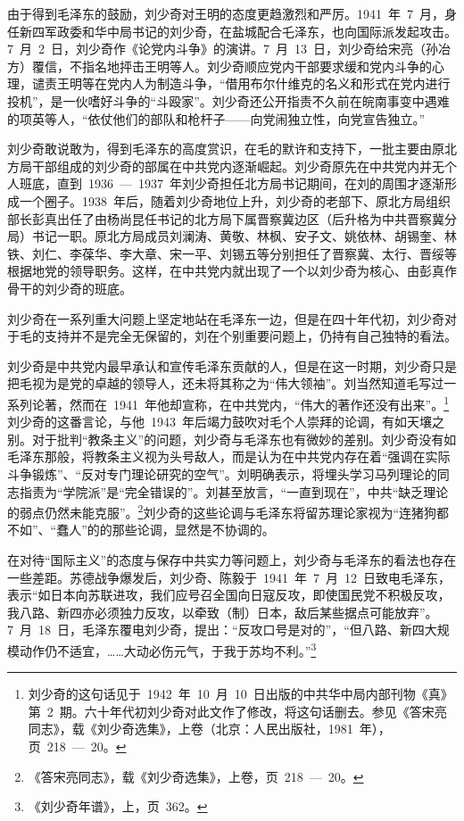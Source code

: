 由于得到毛泽东的鼓励，刘少奇对王明的态度更趋激烈和严厉。1941~年~7~月，身任新四军政委和华中局书记的刘少奇，在盐城配合乇泽东，也向国际派发起攻击。7~月~2~日，刘少奇作《论党内斗争》的演讲。7~月~13~日，刘少奇给宋亮（孙冶方）覆信，不指名地抨击王明等人。刘少奇顺应党内干部要求缓和党内斗争的心理，谴责王明等在党内人为制造斗争，“借用布尔什维克的名义和形式在党内进行投机”，是一伙嗜好斗争的“斗殴家”。刘少奇还公开指责不久前在皖南事变中遇难的项英等人，“依仗他们的部队和枪杆子——向党闹独立性，向党宣告独立。”

刘少奇敢说敢为，得到毛泽东的高度赏识，在毛的默许和支持下，一批主要由原北方局干部组成的刘少奇的部属在中共党内逐渐崛起。刘少奇原先在中共党内并无个人班底，直到~1936~—~1937~年刘少奇担任北方局书记期间，在刘的周围才逐渐形成一个圈子。1938~年后，随着刘少奇地位上升，刘少奇的老部下、原北方局组织部长彭真出任了由杨尚昆任书记的北方局下属晋察冀边区（后升格为中共晋察冀分局）书记一职。原北方局成员刘澜涛、黄敬、林枫、安子文、姚依林、胡锡奎、林铁、刘仁、李葆华、李大章、宋一平、刘锡五等分别担任了晋察冀、太行、晋绥等根据地党的领导职务。这样，在中共党内就出现了一个以刘少奇为核心、由彭真作骨干的刘少奇的班底。

刘少奇在一系列重大问题上坚定地站在毛泽东一边，但是在四十年代初，刘少奇对于毛的支持并不是完全无保留的，刘在个别重要问题上，仍持有自己独特的看法。

刘少奇是中共党内最早承认和宣传毛泽东贡献的人，但是在这一时期，刘少奇只是把毛视为是党的卓越的领导人，还未将其称之为“伟大领袖”。刘当然知道毛写过一系列论著，然而在~1941~年他却宣称，在中共党内，“伟大的著作还没有出来”。\footnote{刘少奇的这句话见于~1942~年~10~月~10~日出版的中共华中局内部刊物《真》第~2~期。六十年代初刘少奇对此文作了修改，将这句话删去。参见《答宋亮同志》，载《刘少奇选集》，上卷（北京：人民出版社，1981~年），页~218~—~20。}刘少奇的这番言论，与他~1943~年后竭力鼓吹对毛个人崇拜的论调，有如天壤之别。对于批判“教条主义”的问题，刘少奇与毛泽东也有微妙的差别。刘少奇没有如毛泽东那般，将教条主义视为头号敌人，而是认为在中共党内存在着“强调在实际斗争锻炼”、“反对专门理论研究的空气”。刘明确表示，将埋头学习马列理论的同志指责为“学院派”是“完全错误的”。刘甚至放言，“一直到现在”，中共“缺乏理论的弱点仍然未能克服”。\footnote{《答宋亮同志》，载《刘少奇选集》，上卷，页~218~—~20。}刘少奇的这些论调与毛泽东将留苏理论家视为“连猪狗都不如”、“蠢人”的的那些论调，显然是不协调的。

在对待“国际主义”的态度与保存中共实力等问题上，刘少奇与毛泽东的看法也存在一些差距。苏德战争爆发后，刘少奇、陈毅于~1941~年~7~月~12~日致电毛泽东，表示“如日本向苏联进攻，我们应号召全国向日寇反攻，即使国民党不积极反攻，我八路、新四亦必须独力反攻，以牵致（制）日本，敌后某些据点可能放弃”。7~月~18~日，毛泽东覆电刘少奇，提出：“反攻口号是对的”，“但八路、新四大规模动作仍不适宜，……大动必伤元气，于我于苏均不利。”\footnote{《刘少奇年谱》，上，页~362。}

